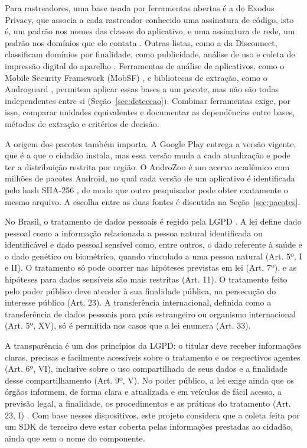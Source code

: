Para rastreadores, uma base usada por ferramentas abertas é a do Exodus Privacy, que associa a cada rastreador conhecido uma assinatura de código, isto é, um padrão nos nomes das classes do aplicativo, e uma assinatura de rede, um padrão nos domínios que ele contata \cite{exodus2026}. Outras listas, como a da Disconnect, classificam domínios por finalidade, como publicidade, análise de uso e coleta de impressão digital do aparelho \cite{disconnect2026}. Ferramentas de análise de aplicativos, como o Mobile Security Framework (MobSF) \cite{mobsf2026}, e bibliotecas de extração, como o Androguard \cite{androguard2026}, permitem aplicar essas bases a um pacote, mas não são todas independentes entre si (Seção~\ref{sec:deteccao}). Combinar ferramentas exige, por isso, comparar unidades equivalentes e documentar as dependências entre bases, métodos de extração e critérios de decisão.

A origem dos pacotes também importa. A Google Play entrega a versão vigente, que é a que o cidadão instala, mas essa versão muda a cada atualização e pode ter a distribuição restrita por região. O AndroZoo é um acervo acadêmico com milhões de pacotes Android, no qual cada versão de um aplicativo é identificada pelo hash SHA-256 \cite{allix2016,alecci2024}, de modo que outro pesquisador pode obter exatamente o mesmo arquivo. A escolha entre as duas fontes é discutida na Seção~\ref{sec:pacotes}.

\label{sec:ref-lgpd}

No Brasil, o tratamento de dados pessoais é regido pela LGPD \cite{brasil2018}. A lei define dado pessoal como a informação relacionada a pessoa natural identificada ou identificável e dado pessoal sensível como, entre outros, o dado referente à saúde e o dado genético ou biométrico, quando vinculado a uma pessoa natural (Art. 5º, I e II). O tratamento só pode ocorrer nas hipóteses previstas em lei (Art. 7º), e as hipóteses para dados sensíveis são mais restritas (Art. 11). O tratamento feito pelo poder público deve atender à sua finalidade pública, na persecução do interesse público (Art. 23). A transferência internacional, definida como a transferência de dados pessoais para país estrangeiro ou organismo internacional (Art. 5º, XV), só é permitida nos casos que a lei enumera (Art. 33).

A transparência é um dos princípios da LGPD: o titular deve receber informações claras, precisas e facilmente acessíveis sobre o tratamento e os respectivos agentes (Art. 6º, VI), inclusive sobre o uso compartilhado de seus dados e a finalidade desse compartilhamento (Art. 9º, V). No poder público, a lei exige ainda que os órgãos informem, de forma clara e atualizada e em veículos de fácil acesso, a previsão legal, a finalidade, os procedimentos e as práticas do tratamento (Art. 23, I) \cite{brasil2018}. Com base nesses dispositivos, este projeto considera que a coleta feita por um SDK de terceiro deve estar coberta pelas informações prestadas ao cidadão, ainda que sem o nome do componente.

